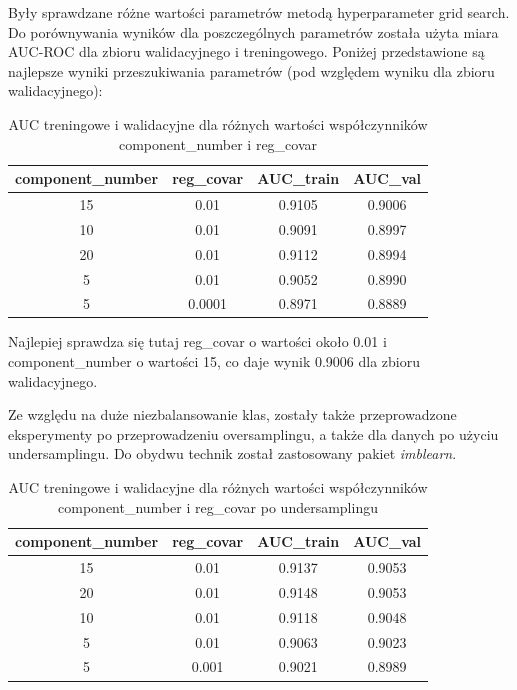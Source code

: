 \documentclass[12pt]{article}
\begin{document}
Były sprawdzane różne wartości parametrów metodą hyperparameter grid search. Do porównywania wyników dla poszczególnych parametrów została użyta miara AUC-ROC dla zbioru walidacyjnego i treningowego. Poniżej przedstawione są najlepsze wyniki przeszukiwania parametrów (pod względem wyniku dla zbioru walidacyjnego):

\begin{table}[h]
    \centering
    \begin{tabular}{|c|c|c|c|}
    \hline
        component\_number & reg\_covar & AUC\_train & AUC\_val \\ \hline
        15 & 0.01 & 0.9105 & 0.9006 \\ \hline 
        10 & 0.01 & 0.9091 & 0.8997 \\ \hline 
        20 & 0.01 & 0.9112 & 0.8994 \\ \hline 
        5 & 0.01 & 0.9052 & 0.8990 \\ \hline 
        5 & 0.0001 & 0.8971 & 0.8889 \\ \hline 
    \end{tabular}
    \caption{AUC treningowe i walidacyjne dla różnych wartości współczynników component\_number i reg\_covar}
    \label{tab:gaussian_mix_gridsearch}
\end{table}

Najlepiej sprawdza się tutaj reg\_covar o wartości około 0.01 i component\_number o wartości 15, co daje wynik 0.9006 dla zbioru walidacyjnego. 

Ze względu na duże niezbalansowanie klas, zostały także przeprowadzone eksperymenty po przeprowadzeniu oversamplingu, a także dla danych po użyciu undersamplingu. Do obydwu technik został zastosowany pakiet \textit{imblearn}.

\begin{table}[h]
    \centering
    \begin{tabular}{|c|c|c|c|}
    \hline
        component\_number & reg\_covar & AUC\_train & AUC\_val \\ \hline
        15 & 0.01 & 0.9137 & 0.9053 \\ \hline 
        20 & 0.01 & 0.9148 & 0.9053 \\ \hline 
        10 & 0.01 & 0.9118 & 0.9048 \\ \hline 
        5 & 0.01 & 0.9063 & 0.9023 \\ \hline 
        5 & 0.001 & 0.9021 & 0.8989 \\ \hline 
    \end{tabular}
    \caption{AUC treningowe i walidacyjne dla różnych wartości współczynników component\_number i reg\_covar po undersamplingu}
    \label{tab:gaussian_mix_gridsearch_undersampling}
\end{table}
\end{document}
